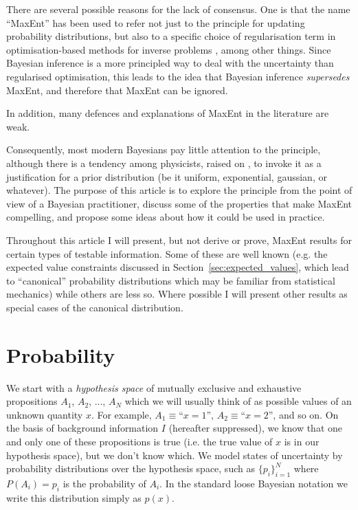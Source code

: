 \documentclass[a4paper, 11pt]{article}
\begin{document}
There are several possible reasons for the lack of consensus. 
One is that the name ``MaxEnt'' has been used to refer not just to the principle
for updating probability distributions, but also to a specific choice of
regularisation term in optimisation-based methods for inverse problems
\citep{}, among other things. Since Bayesian inference is
a more principled way to deal with the uncertainty than regularised
optimisation, this leads to the idea that Bayesian inference
{\it supersedes} MaxEnt, and therefore that MaxEnt can be ignored.

In addition, many defences and explanations of MaxEnt in the literature
are weak.

Consequently, most modern Bayesians pay little attention to the principle,
although there is a tendency among physicists, raised on \citet{jaynes},
to invoke it as a justification
for a prior distribution (be it uniform, exponential, gaussian, or whatever).
The purpose of this article is to explore the principle from the point of
view of a Bayesian practitioner, discuss some of the properties that
make MaxEnt compelling, and propose some ideas about how it could be used in
practice.

Throughout this article I will present, but not derive or prove, MaxEnt
results for certain types of testable information. Some of these are well
known (e.g. the expected value constraints discussed in
Section~\ref{sec:expected_values}, which lead to ``canonical'' probability
distributions which may be familiar from statistical mechanics) while others
are less so. Where possible I will present other results as special cases of
the canonical distribution.

\section{Probability}
We start with a {\it hypothesis space} of mutually exclusive and
exhaustive propositions $A_1$, $A_2$, ..., $A_N$ which we will usually
think of as possible values of an unknown quantity $x$. For example,
$A_1 \equiv $``$x=1$'', $A_2 \equiv $``$x=2$'', and so on.
On the basis of background
information $I$ (hereafter suppressed), we know that one and only one of these
propositions is true (i.e. the true value of $x$ is in our hypothesis space),
but we don't know which. We model states of
uncertainty by probability distributions over the hypothesis space,
such as $\{p_i\}_{i=1}^N$ where $P(A_i) = p_i$ is the probability of $A_i$.
In the standard loose Bayesian notation we write this distribution simply
as $p(x)$.
\end{document}
